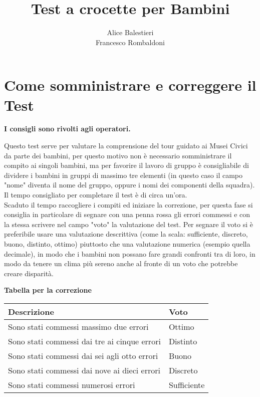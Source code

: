 \documentclass[hidelinks,12pt,a4paper]{exam}
\begin{document}
	
	\title{\textbf{Test a crocette per Bambini}}
	\author{Alice Balestieri\\Francesco Rombaldoni}
	\date{}
	\maketitle
	
	\newpage
	\pagestyle{plain}
	\tableofcontents
	\newpage
	
	\section{Come somministrare e correggere il Test}
	\begin{center}
		\textbf{I consigli sono rivolti agli operatori.}
	\end{center}
	
	Questo test serve per valutare la comprensione del tour guidato ai Musei Civici da parte dei bambini, per questo motivo non è necessario somministrare il compito ai singoli bambini, ma per favorire il lavoro di gruppo è consigliabile di dividere i bambini in gruppi di massimo tre elementi (in questo caso il campo "nome" diventa il nome del gruppo, oppure i nomi dei componenti della squadra). Il tempo consigliato per completare il test è di circa un'ora.\\
	Scaduto il tempo raccogliere i compiti ed iniziare la correzione, per questa fase si consiglia in particolare di segnare con una penna rossa gli errori commessi e con la stessa scrivere nel campo "voto" la valutazione del test. Per segnare il voto si è preferibile usare una valutazione descrittiva (come la scala: sufficiente, discreto, buono, distinto, ottimo) piuttosto che una valutazione numerica (esempio quella decimale), in modo che i bambini non possano fare grandi confronti tra di loro, in modo da tenere un clima più sereno anche al fronte di un voto che potrebbe creare disparità.\\
	
	\begin{center}
		\large{\textbf{Tabella per la correzione}}\\
		\bigskip
		
		\begin{tabularx}{0.5\textwidth} { 
				| >{\raggedright\arraybackslash}X 
				| >{\centering\arraybackslash}X | }
			\hline
			\textbf{Descrizione} & \textbf{Voto} \\
			\hline
			Sono stati commessi massimo due errori & Ottimo\\
			\hline
			Sono stati commessi dai tre ai cinque errori & Distinto\\
			\hline
			Sono stati commessi dai sei agli otto errori & Buono\\
			\hline
			Sono stati commessi dai nove ai dieci errori & Discreto\\
			\hline
			Sono stati commessi numerosi errori & Sufficiente\\
			\hline
		\end{tabularx}
	\end{center}
	
\end{document}
